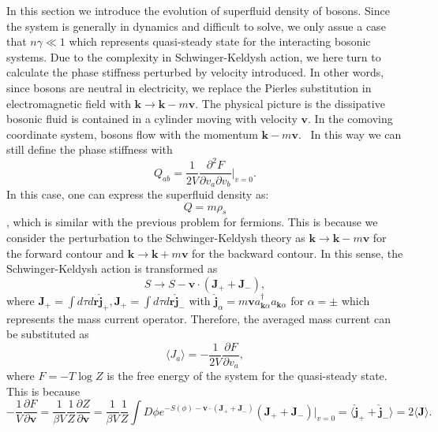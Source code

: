 \documentclass{article}
\newcommand{\nobracket}{}
\newcommand{\tmmathbf}[1]{\ensuremath{\boldsymbol{#1}}}
\begin{document}
In this section we introduce the evolution of superfluid density of bosons.
Since the system is generally in dynamics and difficult to solve, we only
assue a case that $n \gamma \ll 1$ which represents quasi-steady state for the
interacting bosonic systems. Due to the complexity in Schwinger-Keldysh
action, we here turn to calculate the phase stiffness perturbed by velocity
introduced. In other words, since bosons are neutral in electricity, we
replace the Pierles substitution in electromagnetic field with $\tmmathbf{k}
\rightarrow \tmmathbf{k}- m\tmmathbf{v}$. The physical picture is the
dissipative bosonic fluid is contained in a cylinder moving with velocity
$\tmmathbf{v}$. In the comoving coordinate system, bosons flow with the
momentum $\tmmathbf{k}- m\tmmathbf{v}$. \ In this way we can still define the
phase stiffness with
\begin{equation}
  Q_{a b} = \frac{1}{2 V} \frac{\partial^2 F}{\partial v_a \partial v_b} |_{v
  = 0} \nobracket . \label{Qv}
\end{equation}
In this case, one can express the superfluid density as:
\begin{equation}
  Q = m \rho_s
\end{equation}
, which is similar with the previous problem for fermions. This is because we
consider the perturbation to the Schwinger-Keldysh theory as $\tmmathbf{k}
\rightarrow \tmmathbf{k}- m\tmmathbf{v}$ for the forward contour and
$\tmmathbf{k} \rightarrow \tmmathbf{k}+ m\tmmathbf{v}$ for the backward
contour. In this sense, the Schwinger-Keldysh action is transformed as
\begin{equation}
  S \rightarrow S -\tmmathbf{v} \cdot (\tmmathbf{J}_+ +\tmmathbf{J}_-),
\end{equation}
where $\tmmathbf{J}_+ = \int d \tau d\tmmathbf{r} \hat{\tmmathbf{j}}_+,
\tmmathbf{J}_+ = \int d \tau d\tmmathbf{r} \hat{\tmmathbf{j}}_-$ with
$\hat{\tmmathbf{j}}_{\alpha} = m\tmmathbf{v}a_{\tmmathbf{k} \alpha}^{\dagger}
a_{\tmmathbf{k} \alpha}$ for $\alpha = \pm$ which represents the mass current
operator. Therefore, the averaged mass current can be substituted as
\begin{equation}
  \langle J_a \rangle = - \frac{1}{2 V} \frac{\partial F}{\partial v_a},
\end{equation}
where $F = - T \log Z$ is the free energy of the system for the quasi-steady
state. This is because
\begin{equation}
  - \frac{1}{V} \frac{\partial F}{\partial \tmmathbf{v}} = \frac{1}{\beta V}
  \frac{1}{Z} \frac{\partial Z}{\partial \tmmathbf{v}} = \frac{1}{\beta V}
  \frac{1}{Z} \int D \phi e^{- S (\phi) -\tmmathbf{v} \cdot (\tmmathbf{J}_+
  +\tmmathbf{J}_-)} (\tmmathbf{J}_+ +\tmmathbf{J}_-) |_{v = 0} \nobracket =
  \langle \hat{\tmmathbf{j}}_+ + \hat{\tmmathbf{j}}_- \rangle = 2 \langle
  \tmmathbf{J} \rangle .
\end{equation}
\end{document}
